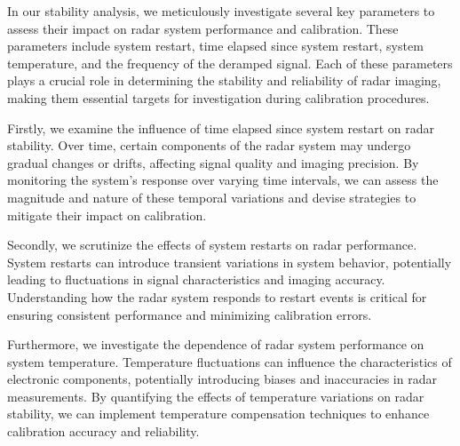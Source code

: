 In our stability analysis, we meticulously investigate several key parameters to assess their impact on radar system performance and calibration.
These parameters include system restart, time elapsed since system restart, system temperature, and the frequency of the deramped signal.
Each of these parameters plays a crucial role in determining the stability and reliability of radar imaging,
making them essential targets for investigation during calibration procedures.

Firstly, we examine the influence of time elapsed since system restart on radar stability.
Over time, certain components of the radar system may undergo gradual changes or drifts,
affecting signal quality and imaging precision. By monitoring the system's response over varying time intervals,
we can assess the magnitude and nature of these temporal variations and devise strategies to mitigate their impact on calibration.

Secondly, we scrutinize the effects of system restarts on radar performance.
System restarts can introduce transient variations in system behavior,
potentially leading to fluctuations in signal characteristics and imaging accuracy.
Understanding how the radar system responds to restart events is critical for ensuring consistent performance and minimizing calibration errors.

Furthermore, we investigate the dependence of radar system performance on system temperature.
Temperature fluctuations can influence the characteristics of electronic components,
potentially introducing biases and inaccuracies in radar measurements.
By quantifying the effects of temperature variations on radar stability,
we can implement temperature compensation techniques to enhance calibration accuracy and reliability.

